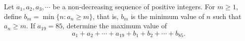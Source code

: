 Let $a_1,a_2,a_3,\cdots$ be a non-decreasing sequence of positive integers. For $m\ge1$,  define $b_m=\min\{n: a_n \ge m\}$,  that is, $b_m$ is the minimum value of $n$ such that $a_n\ge m$. If $a_{19}=85$,  determine the maximum value of \[a_1+a_2+\cdots+a_{19}+b_1+b_2+\cdots+b_{85}.\]